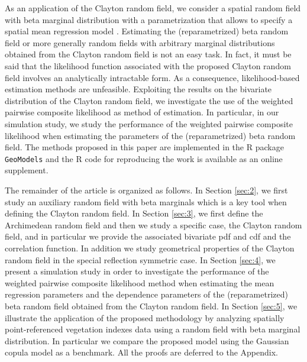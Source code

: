 \documentclass[times,sort&compress,3p]{elsarticle}
\theoremstyle{plain}%
\theoremstyle{definition}
\begin{document}
As an application of the Clayton  random field, we consider a spatial random field  %
 with beta marginal  distribution with a  parametrization that allows to specify a spatial  mean  regression model   \citep{ferrari2004beta}.
Estimating the (reparametrized) beta random field or more generally  random fields with arbitrary marginal distributions obtained from the  Clayton random field  is not an easy task.
In fact, it must be said that the likelihood function associated with the proposed Clayton random field involves an analytically intractable form. As a consequence, likelihood-based  estimation methods  are unfeasible. Exploiting the results on the bivariate distribution of the Clayton  random field, we investigate the use of the weighted pairwise composite likelihood \citep{Lindsay:1988,Varin:2008} as method of estimation. In particular, in our simulation study, we study the performance of the weighted pairwise composite likelihood when estimating the parameters of the (reparametrized) beta random field. The methods proposed in this paper are implemented in the \textsf{R} package \texttt{GeoModels} \citep{Bevilacqua:2018aa} and the \textsf{R} code for reproducing the work is available as an online supplement.

The remainder of the article is organized
as follows. In Section \ref{sec:2}, we first study  an auxiliary random field with beta marginals which is a key tool when defining the Clayton random field. In Section \ref{sec:3}, we
first define  the Archimedean random field  and then we study a specific case, the Clayton random field, and in particular we provide the associated  bivariate pdf and cdf and the correlation function.
In addition we study geometrical properties of the Clayton random field in the special reflection symmetric case.
 In Section \ref{sec:4}, we present a simulation study
in order to investigate the performance of the  weighted pairwise composite likelihood  method when estimating the mean regression parameters and the dependence parameters of the (reparametrized) beta random field obtained from the Clayton random field. In Section \ref{sec:5}, we illustrate  the application
of the proposed methodology
 by analyzing spatially point-referenced vegetation indexes data using a random field with beta marginal distribution. In particular we compare the proposed model using the  Gaussian copula model as a benchmark. All the proofs are deferred to the Appendix.
\end{document}
